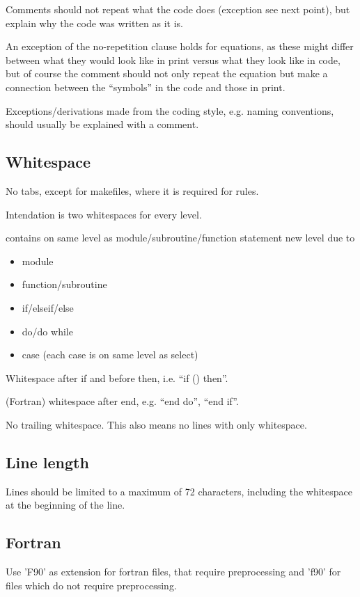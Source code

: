 \documentclass{article}
\begin{document}
Comments should not repeat what the code does (exception see next
point), but explain why the code was written as it is.

An exception of the no-repetition clause holds for equations, as these
might differ between what they would look like in print versus what they
look like in code, but of course the comment should not only repeat the
equation but make a connection between the ``symbols'' in the code and
those in print.

Exceptions/derivations made from the coding style, e.g. naming
conventions, should usually be explained with a comment.

\subsection{Whitespace}
No tabs, except for makefiles, where it is required for rules.

Intendation is two whitespaces for every level.

contains on same level as module/subroutine/function statement
new level due to
\begin{itemize}
  \item module
  \item function/subroutine
  \item if/elseif/else
  \item do/do while
  \item case (each case is on same level as select)
\end{itemize}

Whitespace after if and before then, i.e. ``if () then''.

(Fortran) whitespace after end, e.g. ``end do'', ``end if''.

No trailing whitespace. This also means no lines with only whitespace.

\subsection{Line length}
Lines should be limited to a maximum of 72 characters, including the
whitespace at the beginning of the line.

\subsection{Fortran}
Use 'F90' as extension for fortran files, that require preprocessing and
'f90' for files which do not require preprocessing.
\end{document}
